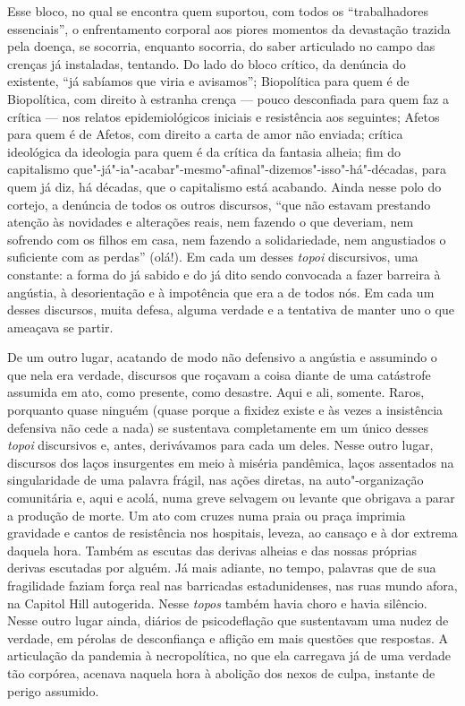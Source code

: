 Esse bloco, no qual se encontra quem suportou, com todos os
``trabalhadores essenciais'', o enfrentamento corporal aos piores
momentos da devastação trazida pela doença, se socorria, enquanto
socorria, do saber articulado no campo das crenças já instaladas,
tentando. Do lado do bloco crítico, da denúncia do existente, ``já
sabíamos que viria e avisamos''; Biopolítica para quem é de Biopolítica,
com direito à estranha crença --- pouco desconfiada para quem faz a
crítica --- nos relatos epidemiológicos iniciais e resistência aos
seguintes; Afetos para quem é de Afetos, com direito a carta de amor não
enviada; crítica ideológica da ideologia para quem é da crítica da
fantasia alheia; fim do capitalismo
que"-já"-ia"-acabar"-mesmo"-afinal"-dizemos"-isso"-há"-décadas, para quem já diz,
há décadas, que o capitalismo está acabando. Ainda nesse polo do
cortejo, a denúncia de todos os outros discursos, ``que não estavam
prestando atenção às novidades e alterações reais, nem fazendo o que
deveriam, nem sofrendo com os filhos em casa, nem fazendo a
solidariedade, nem angustiados o suficiente com as perdas'' (olá!). Em
cada um desses \emph{topoi} discursivos, uma constante: a forma do já
sabido e do já dito sendo convocada a fazer barreira à angústia, à
desorientação e à impotência que era a de todos nós. Em cada um desses
discursos, muita defesa, alguma verdade e a tentativa de manter uno o
que ameaçava se partir.

De um outro lugar, acatando de modo não defensivo a angústia e assumindo
o que nela era verdade, discursos que roçavam a coisa diante de uma
catástrofe assumida em ato, como presente, como desastre. Aqui e ali,
somente. Raros, porquanto quase ninguém (quase porque a fixidez existe e
às vezes a insistência defensiva não cede a nada) se sustentava
completamente em um único desses \emph{topoi} discursivos e, antes,
derivávamos para cada um deles. Nesse outro lugar, discursos dos laços
insurgentes em meio à miséria pandêmica, laços assentados na
singularidade de uma palavra frágil, nas ações diretas, na
auto"-organização comunitária e, aqui e acolá, numa greve selvagem ou
levante que obrigava a parar a produção de morte. Um ato com cruzes numa
praia ou praça imprimia gravidade e cantos de resistência nos hospitais,
leveza, ao cansaço e à dor extrema daquela hora. Também as escutas das
derivas alheias e das nossas próprias derivas escutadas por alguém. Já
mais adiante, no tempo, palavras que de sua fragilidade faziam força
real nas barricadas estadunidenses, nas ruas mundo afora, na Capitol
Hill autogerida. Nesse \emph{topos} também havia choro e havia silêncio.
Nesse outro lugar ainda, diários de psicodeflação que sustentavam uma
nudez de verdade, em pérolas de desconfiança e aflição em mais questões
que respostas. A articulação da pandemia à necropolítica, no que ela
carregava já de uma verdade tão corpórea, acenava naquela hora à
abolição dos nexos de culpa, instante de perigo assumido.


